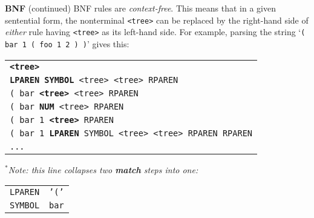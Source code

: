 \begin{minipage}[t]{\sw}
\slidenumber
\LARGE
{\bf BNF} (continued)\exx
\emm{\LightBox{\MYtree}}\exx
BNF rules are {\em context-free}.
This means that in a given sentential form,
the nonterminal \verb'<tree>'
can be replaced by the right-hand side 
of {\em either} rule having \verb'<tree>' as its left-hand side.
For example, parsing the string `\verb'( bar 1 ( foo 1 2 ) )'' gives this:\exx
\emm%
\begin{tabular}{@{ $\Rightarrow$ }l}
\multicolumn{1}{l}{\tt{\bf <tree>}} \\
{\tt{\bf LPAREN SYMBOL} <tree> <tree> RPAREN} \\
{\tt ( bar {\bf <tree>} <tree> RPAREN}\hspace*{2em}{\em [$^*$see below...]}\\
{\tt ( bar {\bf NUM} <tree> RPAREN} \\
{\tt ( bar 1 {\bf <tree>} RPAREN} \\
{\tt ( bar 1 {\bf LPAREN} SYMBOL <tree> <tree> RPAREN RPAREN}\\
\verb'...' \\
\end{tabular}\exx
{\em $^*$Note: this line collapses two {\bf match} steps into one:}\exx
\emm%
\begin{tabular}{l@{ $\Rightarrow$ }l}
{\tt LPAREN} & {\tt '('} \\
{\tt SYMBOL} & {\tt bar} \\
\end{tabular}

\end{minipage}
\clearpage
